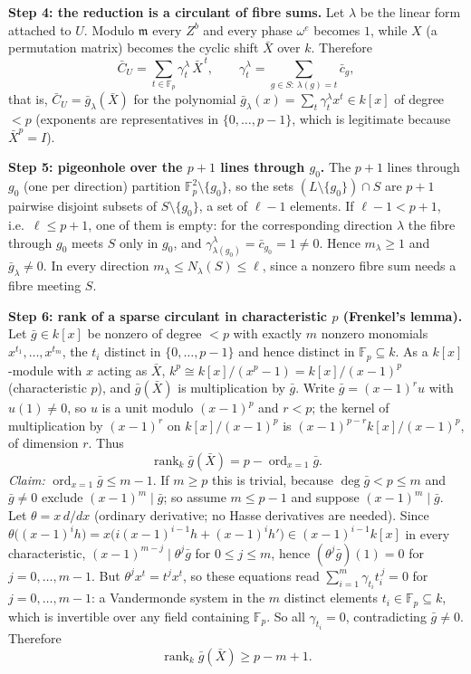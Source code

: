 \documentclass[
  11pt,
  a4paper,
]{article}
\begin{document}
\textbf{Step 4: the reduction is a circulant of fibre sums.} Let
\(\lambda\) be the linear form attached to \(U\). Modulo \(\mathfrak m\)
every \(Z^b\) and every phase \(\omega^e\) becomes \(1\), while \(X\) (a
permutation matrix) becomes the cyclic shift \(\bar X\) over \(k\).
Therefore
\[\bar C_U=\sum_{t\in\mathbb F_p}\gamma^\lambda_t\,\bar X^{\,t},\qquad\gamma^\lambda_t=\sum_{g\in S:\ \lambda(g)=t}\bar c_g,\tag{4.2}\]
that is, \(\bar C_U=\bar g_\lambda(\bar X)\) for the polynomial
\(\bar g_\lambda(x)=\sum_t\gamma^\lambda_tx^t\in k[x]\) of degree \(<p\)
(exponents are representatives in \(\{0,\allowbreak{}\dots,\allowbreak{}p-1\}\), which is
legitimate because \(\bar X^p=I\)).

\textbf{Step 5: pigeonhole over the \(p+1\) lines through \(g_0\).} The
\(p+1\) lines through \(g_0\) (one per direction) partition
\(\mathbb F_p^2\setminus\{g_0\}\), so the sets
\((L\setminus\{g_0\})\cap S\) are \(p+1\) pairwise disjoint subsets of
\(S\setminus\{g_0\}\), a set of \(\ell-1\) elements. If \(\ell-1<p+1\),
i.e.~\(\ell\le p+1\), one of them is empty: for the corresponding
direction \(\lambda\) the fibre through \(g_0\) meets \(S\) only in
\(g_0\), and \(\gamma^\lambda_{\lambda(g_0)}=\bar c_{g_0}=1\ne0\). Hence
\(m_\lambda\ge1\) and \(\bar g_\lambda\ne0\). In every direction
\(m_\lambda\le N_\lambda(S)\le\ell\), since a nonzero fibre sum needs a
fibre meeting \(S\).

\textbf{Step 6: rank of a sparse circulant in characteristic \(p\)
(Frenkel's lemma).} Let \(\bar g\in k[x]\) be nonzero of degree \(<p\)
with exactly \(m\) nonzero monomials \(x^{t_1},\allowbreak{}\dots,\allowbreak{}x^{t_m}\), the
\(t_i\) distinct in \(\{0,\allowbreak{}\dots,\allowbreak{}p-1\}\) and hence distinct in
\(\mathbb F_p\subseteq k\). As a \(k[x]\)-module with \(x\) acting as
\(\bar X\), \(k^p\cong k[x]/(x^p-1)=k[x]/(x-1)^p\) (characteristic
\(p\)), and \(\bar g(\bar X)\) is multiplication by \(\bar g\). Write
\(\bar g=(x-1)^ru\) with \(u(1)\ne0\), so \(u\) is a unit modulo
\((x-1)^p\) and \(r<p\); the kernel of multiplication by \((x-1)^r\) on
\(k[x]/(x-1)^p\) is \((x-1)^{p-r}k[x]/(x-1)^p\), of dimension \(r\).
Thus
\[\operatorname{rank}_k\bar g(\bar X)=p-\operatorname{ord}_{x=1}\bar g.\]
\emph{Claim:} \(\operatorname{ord}_{x=1}\bar g\le m-1\). If \(m\ge p\)
this is trivial, because \(\deg\bar g<p\le m\) and \(\bar g\ne0\)
exclude \((x-1)^m\mid\bar g\); so assume \(m\le p-1\) and suppose
\((x-1)^m\mid\bar g\). Let \(\theta=x\,\allowbreak{}d/dx\) (ordinary derivative; no
Hasse derivatives are needed). Since
\(\theta\big((x-1)^ih\big)=x\big(i(x-1)^{i-1}h+(x-1)^ih'\big)\in(x-1)^{i-1}k[x]\)
in every characteristic, \((x-1)^{m-j}\mid\theta^j\bar g\) for
\(0\le j\le m\), hence \((\theta^j\bar g)(1)=0\) for \(j=0,\allowbreak{}\dots,\allowbreak{}m-1\).
But \(\theta^jx^t=t^jx^t\), so these equations read
\(\sum_{i=1}^m\gamma_{t_i}t_i^{\,\allowbreak{}j}=0\) for \(j=0,\allowbreak{}\dots,\allowbreak{}m-1\): a
Vandermonde system in the \(m\) distinct elements
\(t_i\in\mathbb F_p\subseteq k\), which is invertible over any field
containing \(\mathbb F_p\). So all \(\gamma_{t_i}=0\), contradicting
\(\bar g\ne0\). Therefore
\[\operatorname{rank}_k\bar g(\bar X)\ge p-m+1.\tag{4.3}\]
\end{document}

